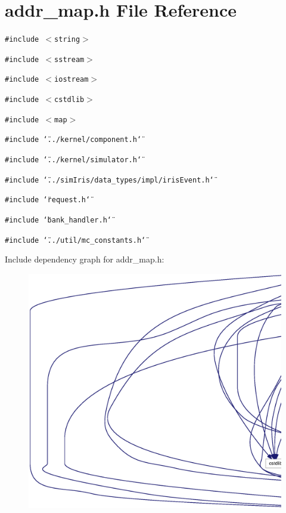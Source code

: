 \section{addr\_\-map.h File Reference}
\label{addr__map_8h}
{\tt \#include $<$string$>$}\par
{\tt \#include $<$sstream$>$}\par
{\tt \#include $<$iostream$>$}\par
{\tt \#include $<$cstdlib$>$}\par
{\tt \#include $<$map$>$}\par
{\tt \#include \char`\"{}../kernel/component.h\char`\"{}}\par
{\tt \#include \char`\"{}../kernel/simulator.h\char`\"{}}\par
{\tt \#include \char`\"{}../simIris/data\_\-types/impl/irisEvent.h\char`\"{}}\par
{\tt \#include \char`\"{}request.h\char`\"{}}\par
{\tt \#include \char`\"{}bank\_\-handler.h\char`\"{}}\par
{\tt \#include \char`\"{}../util/mc\_\-constants.h\char`\"{}}\par


Include dependency graph for addr\_\-map.h:\nopagebreak
\begin{figure}[H]
\begin{center}
\leavevmode
\includegraphics[width=420pt]{addr__map_8h__incl}
\end{center}
\end{figure}


